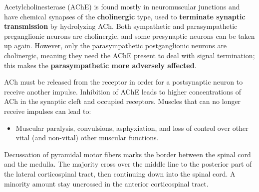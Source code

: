 \documentclass[plain,basic]{inVerba-notes}
\begin{document}
\begin{enumerate} 

  Acetylcholinesterase (AChE) is found mostly in neuromuscular junctions and have chemical synapses of the \textbf{cholinergic} type, used to \textbf{terminate synaptic transmission} by hydrolyzing ACh. Both sympathetic and parasympathetic preganglionic neurons are cholinergic, and some presynaptic neurons can be taken up again. However, only the parasympathetic postganglionic neurons are cholinergic, meaning they need the AChE present to deal with signal termination; this makes the \textbf{parasympathetic more adversely affected}.
  

  ACh must be released from the receptor in order for a postsynaptic neuron to receive another impulse. Inhibition of AChE leads to higher concentrations of ACh in the synaptic cleft and occupied receptors. Muscles that can no longer receive impulses can lead to:

  \begin{itemize}
    \item Muscular paralysis, convulsions, asphyxiation, and loss of control over other vital (and non-vital) other muscular functions.
  \end{itemize}
  

  Decussation of pyramidal motor fibers marks the border between the spinal cord and the medulla. The majority cross over the middle line to the posterior part of the lateral corticospinal tract, then continuing down into the spinal cord. A minority amount stay uncrossed in the anterior corticospinal tract. 


\end{enumerate}
\end{document}
